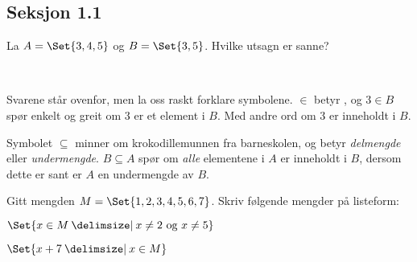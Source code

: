 \documentclass[a4paper,11pt]{article}
\begin{document}

\frontpageUiT




\subsection*{Seksjon 1.1}

\begin{problem}[1]
  La $A = \Set{3, 4, 5}$ og $B = \Set{3, 5}$. Hvilke 
  utsagn er sanne?
  \begin{tabenum}%
     \UiTcorrect
     \UiTcorrect
     \UiTwrong \\[1ex]
     \UiTcorrect
     \UiTwrong
     \UiTcorrect
  \end{tabenum}
\end{problem}


\begin{solution}
  Svarene står ovenfor, men la oss raskt forklare symbolene. $\in$ betyr
  , og $3 \in B$ spør enkelt og greit om $3$ er et element i
  $B$.  Med andre ord om $3$ er inneholdt i $B$.

  Symbolet $\subseteq$ minner om krokodillemunnen fra barneskolen, og betyr
  \emph{delmengde} eller \emph{undermengde}. $B \subseteq A$ spør om \emph{alle}
  elementene i $A$ er inneholdt i $B$, dersom dette er sant er $A$ en
  undermengde av $B$.
\end{solution}

\begin{problem}
  Gitt mengden $M = \Set{1, 2, 3, 4, 5, 6, 7}$. Skriv følgende
  mengder på listeform:
    \begin{subproblem}{2}
      \item $\Set{x \in M \given x \neq 2 \ \text{og} \ x \neq 5}$
        \label{subproblem:1.1-2a-oving-01-2019-MAT-0001}
      \item $\Set{x + 7 \given x \in M}$
        \label{subproblem:1.1-2b-oving-01-2019-MAT-0001}
    \end{subproblem}
\end{problem}
\end{document}

